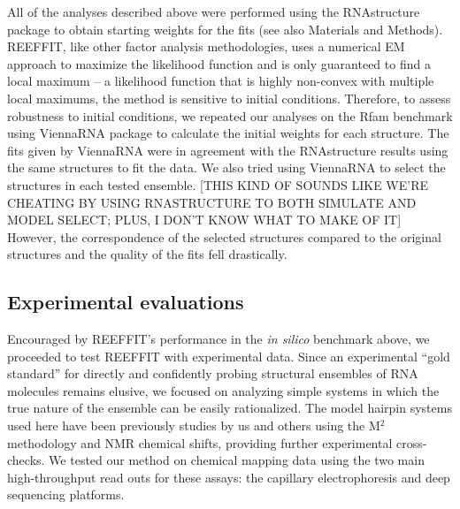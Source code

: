 \documentclass[12pt]{article}
\begin{document}
All of the analyses described above were performed using the RNAstructure package to obtain starting weights for the fits (see also Materials and Methods). 
REEFFIT, like other factor analysis methodologies, uses a numerical EM approach to maximize the likelihood function and is only guaranteed to find a local maximum -- a likelihood function that is highly non-convex with multiple local maximums, the method is sensitive to initial conditions.
Therefore, to assess robustness to initial conditions, we repeated our analyses on the Rfam benchmark using ViennaRNA package to calculate the initial weights for each structure.
The fits given by ViennaRNA were in agreement with the RNAstructure results using the same structures to fit the data.
We also tried using ViennaRNA to select the structures in each tested ensemble. 
[THIS KIND OF SOUNDS LIKE WE'RE CHEATING BY USING RNASTRUCTURE TO BOTH SIMULATE AND MODEL SELECT; PLUS, I DON'T KNOW WHAT TO MAKE OF IT] However, the correspondence of the selected structures compared to the original structures and the quality of the fits fell drastically.  



\subsection{Experimental evaluations}

Encouraged by REEFFIT's performance in the \textit{in silico} benchmark above, we proceeded to test REEFFIT with experimental data. 
Since an experimental ``gold standard'' for directly and confidently probing structural ensembles of RNA molecules remains elusive, we focused on analyzing simple systems in which the true nature of the ensemble can be easily rationalized.
The model hairpin systems used here have been previously studies by us and others using the M$^2$ methodology and NMR chemical shifts, providing further experimental cross-checks.
We tested our method on chemical mapping data using the two main high-throughput read outs for these assays: the capillary electrophoresis and deep sequencing platforms. 
\end{document}
